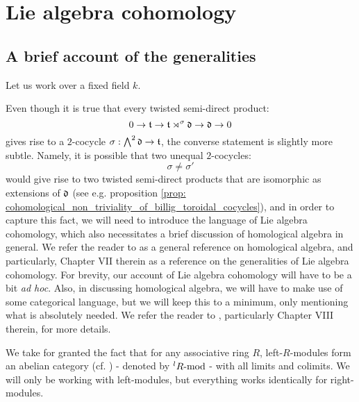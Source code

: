 \section{Lie algebra cohomology}
    \subsection{A brief account of the generalities}
        Let us work over a fixed field $k$.
    
        Even though it is true that every twisted semi-direct product:
            $$0 \to \t \to \t \rtimes^{\sigma} \d \to \d \to 0$$
        gives rise to a $2$-cocycle $\sigma: \bigwedge^2 \d \to \t$, the converse statement is slightly more subtle. Namely, it is possible that two unequal $2$-cocycles:
            $$\sigma \not = \sigma'$$
        would give rise to two twisted semi-direct products that are isomorphic as extensions of $\d$ (see e.g. proposition \ref{prop: cohomological_non_triviality_of_billig_toroidal_cocycles}), and in order to capture this fact, we will need to introduce the language of Lie algebra cohomology, which also necessitates a brief discussion of homological algebra in general. We refer the reader to \cite{hilton_stammbach_homological_algebra} as a general reference on homological algebra, and particularly, Chapter VII therein as a reference on the generalities of Lie algebra cohomology. For brevity, our account of Lie algebra cohomology will have to be a bit \textit{ad hoc}. Also, in discussing homological algebra, we will have to make use of some categorical language, but we will keep this to a minimum, only mentioning what is absolutely needed. We refer the reader to \cite{maclane}, particularly Chapter VIII therein, for more details.
        
        We take for granted the fact that for any associative ring $R$, left-$R$-modules form an abelian category (cf. \cite[Section VIII.3, p. 198]{maclane}) - denoted by ${}^lR\mod$ - with all limits and colimits. We will only be working with left-modules, but everything works identically for right-modules.

